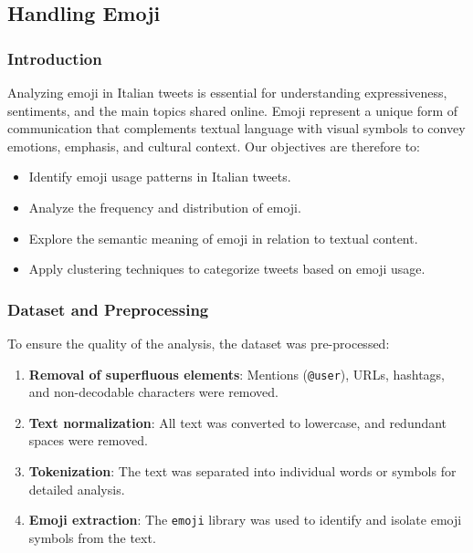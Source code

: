 \subsection{Handling Emoji}

\subsubsection{Introduction}
Analyzing emoji in Italian tweets is essential for understanding expressiveness, sentiments, and the main topics shared online. Emoji represent a unique form of communication that complements textual language with visual symbols to convey emotions, emphasis, and cultural context. Our objectives are therefore to:
\begin{itemize}
    \item Identify emoji usage patterns in Italian tweets.
    \item Analyze the frequency and distribution of emoji.
    \item Explore the semantic meaning of emoji in relation to textual content.
    \item Apply clustering techniques to categorize tweets based on emoji usage.
\end{itemize}

\subsubsection{Dataset and Preprocessing}
To ensure the quality of the analysis, the dataset was pre-processed:
\begin{enumerate}
    \item \textbf{Removal of superfluous elements}: Mentions (\texttt{@user}), URLs, hashtags, and non-decodable characters were removed.
    \item \textbf{Text normalization}: All text was converted to lowercase, and redundant spaces were removed.
    \item \textbf{Tokenization}: The text was separated into individual words or symbols for detailed analysis.
    \item \textbf{Emoji extraction}: The \texttt{emoji} library was used to identify and isolate emoji symbols from the text.
\end{enumerate}

